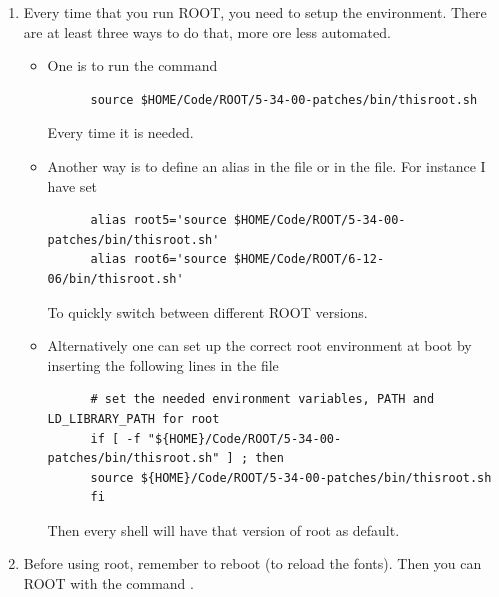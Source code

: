 \begin{enumerate}[resume]
\item Every time that you run ROOT, you need to setup the environment. There are
  at least three ways to do that, more ore less automated.
  \begin{itemize}
  \item One is to run the command%
\begin{lstlisting}
      source $HOME/Code/ROOT/5-34-00-patches/bin/thisroot.sh
\end{lstlisting}
    Every time it is needed.
  \item Another way is to define an alias in the 
    file or in the  file. For instance I have set
\begin{lstlisting}
      alias root5='source $HOME/Code/ROOT/5-34-00-patches/bin/thisroot.sh'
      alias root6='source $HOME/Code/ROOT/6-12-06/bin/thisroot.sh'
\end{lstlisting}
    To quickly switch between different ROOT versions.
  \item Alternatively one can set up the correct root environment at boot by
    inserting the following lines in the  file
\begin{lstlisting}
      # set the needed environment variables, PATH and LD_LIBRARY_PATH for root
      if [ -f "${HOME}/Code/ROOT/5-34-00-patches/bin/thisroot.sh" ] ; then
      source ${HOME}/Code/ROOT/5-34-00-patches/bin/thisroot.sh
      fi
\end{lstlisting}
    Then every shell will have that version of root as default.
  \end{itemize}
\item Before using root, remember to reboot (to reload the fonts). Then you can
  ROOT with the command .
\end{enumerate}

